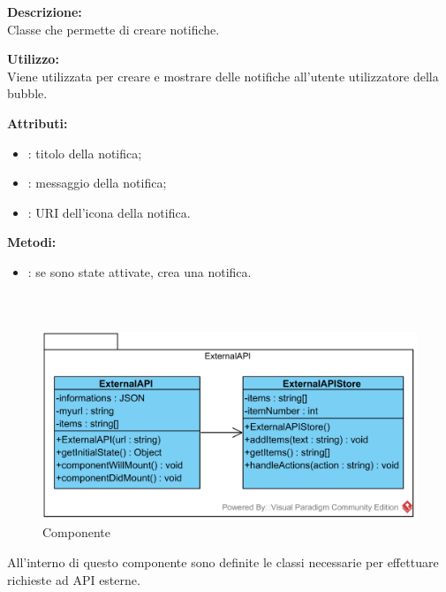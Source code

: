 \textbf{Descrizione:}\\
Classe che permette di creare notifiche.

\textbf{Utilizzo:}\\
Viene utilizzata per creare e mostrare delle notifiche all'utente utilizzatore della bubble.



\textbf{Attributi:}
\begin{itemize}
	\item {}: titolo della notifica;
	\item {}: messaggio della notifica;
	\item {}: URI dell'icona della notifica.
\end{itemize}

\textbf{Metodi:}
\begin{itemize}
	\item {}: se sono state attivate, crea una notifica.
\end{itemize}

\subparagraph[::ExternalAPI]{\class}\mbox{}\\ \label{\class}
\begin{figure}[H]
	\centering
	\includegraphics[width=15cm]{./diagrammi/framework/model/api/externalapi.png}
	\caption{Componente \class}
\end{figure}
All'interno di questo componente sono definite le classi necessarie per effettuare richieste ad API esterne.

\subsubparagraph[::ExternalAPI]{\class}\mbox{}\\ \label{\class}

